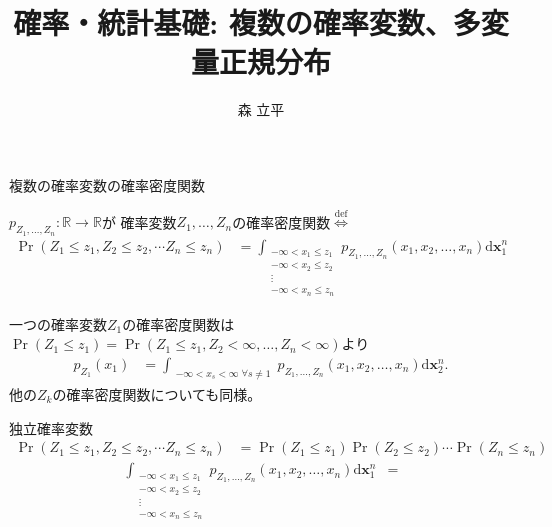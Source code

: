 \documentclass[lualatex,handout]{beamer}
\title{確率・統計基礎: 複数の確率変数、多変量正規分布}
\author{森 立平}
\date{}
\newcommand{\mycolor}[2]{%
  \begingroup
  \colorlet{currentcolor}{.}%
  \color{#1}#2%
  \color{currentcolor}%
  \endgroup
}
\newcommand{\emm}[1]{\mycolor{red}{#1}}
\theoremstyle{definition}
\begin{document}
\begin{frame}[plain]
\maketitle
\end{frame}


\begin{frame}{複数の確率変数の確率密度関数}
\small
\begin{definition}
$p_{Z_1,\dotsc,Z_n}\colon \mathbb{R}\to\mathbb{R}$が
確率変数$Z_1,\dotsc,Z_n$の確率密度関数$\stackrel{\mathrm{def}}{\iff}$
\begin{align*}
\Pr(Z_1\le z_1, Z_2\le z_2,\dotsm Z_n\le z_n)&=
\int_{\substack{-\infty< x_1 \le z_1\\ -\infty< x_2\le z_2\\\vdots\\-\infty<x_n\le z_n}} p_{Z_1,\dotsc,Z_n}(x_1,x_2,\dotsc,x_n)\mathrm{d}{\symbf{x}_1^n}
\end{align*}
\end{definition}
一つの確率変数$Z_1$の確率密度関数は$\Pr(Z_1\le z_1) = \Pr(Z_1\le z_1, Z_2 <\infty,\dotsc, Z_n<\infty)$より
\begin{align*}
p_{Z_1}(x_1)&=
\int_{\substack{-\infty< x_s <\infty \;\forall s\ne 1}} p_{Z_1,\dotsc,Z_n}(x_1,x_2,\dotsc,x_n)\mathrm{d}{\symbf{x}_2^n}.
\end{align*}
他の$Z_k$の確率密度関数についても同様。
\end{frame}

\begin{frame}{独立確率変数}
\begin{align*}
\Pr(Z_1\le z_1, Z_2\le z_2,\dotsm Z_n\le z_n)&=
\Pr(Z_1\le z_1)\Pr(Z_2\le z_2)\dotsm \Pr(Z_n\le z_n)
\end{align*}
\begin{align*}
\int_{\substack{-\infty< x_1 \le z_1\\ -\infty< x_2\le z_2\\\vdots\\-\infty<x_n\le z_n}} p_{Z_1,\dotsc,Z_n}(x_1,x_2,\dotsc,x_n)\mathrm{d}{\symbf{x}_1^n}
&=
\end{align*}
\end{frame}
\end{document}

